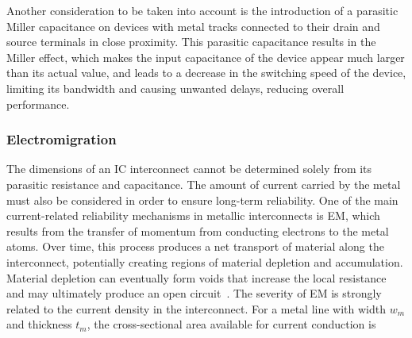 Another consideration to be taken into account is the introduction of a parasitic Miller capacitance on devices with metal tracks connected to their drain and source terminals in close proximity. This parasitic capacitance results in the Miller effect, which makes the input capacitance of the device appear much larger than its actual value, and leads to a decrease in the switching speed of the device, limiting its bandwidth and causing unwanted delays, reducing overall performance.



\subsubsection{Electromigration}\label{sec:electromigration}
The dimensions of an \ac{IC} interconnect cannot be determined solely from its parasitic resistance and capacitance. The amount of current carried by the metal must also be considered in order to ensure long-term reliability. One of the main current-related reliability mechanisms in metallic interconnects is \ac{EM}, which results from the transfer of momentum from conducting electrons to the metal atoms. Over time, this process produces a net transport of material along the interconnect, potentially creating regions of material depletion and accumulation. Material depletion can eventually form voids that increase the local resistance and may ultimately produce an open circuit~\cite{layout_fundamentals,EM_inside_logic_cells,black_EM}.
The severity of \ac{EM} is strongly related to the current density in the interconnect. For a metal line with width $w_m$ and thickness $t_m$, the cross-sectional area available for current conduction is

